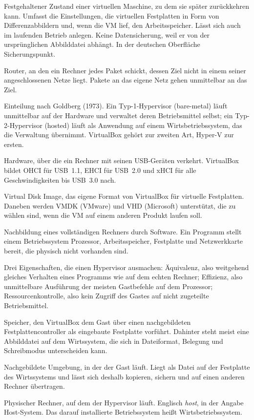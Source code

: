 \begin{glossar}
Festgehaltener Zustand einer virtuellen Maschine, zu dem sie später zurückkehren kann. Umfasst die Einstellungen, die virtuellen Festplatten in Form von Differenzabbildern und, wenn die VM lief, den Arbeitsspeicher. Lässt sich auch im laufenden Betrieb anlegen. Keine Datensicherung, weil er von der ursprünglichen Abbilddatei abhängt. In der deutschen Oberfläche Sicherungspunkt.

Router, an den ein Rechner jedes Paket schickt, dessen Ziel nicht in einem seiner angeschlossenen Netze liegt. Pakete an das eigene Netz gehen unmittelbar an das Ziel.

Einteilung nach Goldberg (1973). Ein Typ-1-Hypervisor (bare-metal) läuft unmittelbar auf der Hardware und verwaltet deren Betriebsmittel selbst; ein Typ-2-Hypervisor (hosted) läuft als Anwendung auf einem Wirtsbetriebssystem, das die Verwaltung übernimmt. VirtualBox gehört zur zweiten Art, Hyper-V zur ersten.

Hardware, über die ein Rechner mit seinen USB-Geräten verkehrt. VirtualBox bildet OHCI für USB~1.1, EHCI für USB~2.0 und xHCI für alle Geschwindigkeiten bis USB~3.0 nach.

Virtual Disk Image, das eigene Format von VirtualBox für virtuelle Festplatten. Daneben werden VMDK (VMware) und VHD (Microsoft) unterstützt, die zu wählen sind, wenn die VM auf einem anderen Produkt laufen soll.

Nachbildung eines vollständigen Rechners durch Software. Ein Programm stellt einem Betriebssystem Prozessor, Arbeitsspeicher, Festplatte und Netzwerkkarte bereit, die physisch nicht vorhanden sind.

Drei Eigenschaften, die einen Hypervisor ausmachen: Äquivalenz, also weitgehend gleiches Verhalten eines Programms wie auf dem echten Rechner; Effizienz, also unmittelbare Ausführung der meisten Gastbefehle auf dem Prozessor; Ressourcenkontrolle, also kein Zugriff des Gastes auf nicht zugeteilte Betriebsmittel.

Speicher, den VirtualBox dem Gast über einen nachgebildeten Festplattencontroller als eingebaute Festplatte vorführt. Dahinter steht meist eine Abbilddatei auf dem Wirtssystem, die sich in Dateiformat, Belegung und Schreibmodus unterscheiden kann.

Nachgebildete Umgebung, in der der Gast läuft. Liegt als Datei auf der Festplatte des Wirtssystems und lässt sich deshalb kopieren, sichern und auf einen anderen Rechner übertragen.

Physischer Rechner, auf dem der Hypervisor läuft. Englisch \emph{host}, in der Angabe Host-System. Das darauf installierte Betriebssystem heißt Wirtsbetriebssystem.

\end{glossar}
